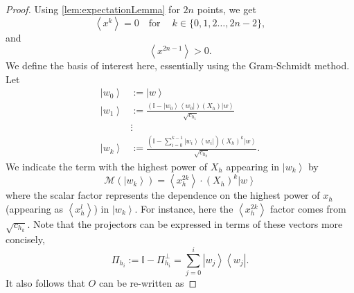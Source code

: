 \documentclass{theoretics}
\begin{document}
\begin{proof}
  Using \cref{lem:expectationLemma} for $2n$ points, we get
  \begin{equation}
    \left\langle x^{k}\right\rangle =0\ \ \  \text{ for }\ \ \ \  k\in\{0,1,2\dots,2n-2\},\label{eq:Mochonsf0equality}
  \end{equation}
  and
  \begin{equation}
    \left\langle x^{2n-1}\right\rangle >0.\label{eq:Mochonsf0Positivity}
  \end{equation}
  We define the basis of interest here, essentially using the Gram-Schmidt
  method. Let
  \begin{align}
    \left|w_{0}\right\rangle & :=\left|w\right\rangle \nonumber                                                                                                                                     \\
    \left|w_{1}\right\rangle & :=\frac{\left(\mathbb{I}-\left|w_{0}\right\rangle \left\langle w_{0}\right|\right)(X_{h})\left|w\right\rangle }{\sqrt{c_{h_{1}}}}\nonumber                           \\
                             & \vdots\nonumber                                                                                                                                                      \\
    \left|w_{k}\right\rangle & :=\frac{\left(\mathbb{I}-\sum_{i=0}^{k-1}\left|w_{i}\right\rangle \left\langle w_{i}\right|\right)(X_{h})^{k}\left|w\right\rangle }{\sqrt{c_{h_{k}}}}.\label{eq:w_k}
  \end{align}
  We indicate the term with the highest power of $X_{h}$ appearing
  in $\left|w_{k}\right\rangle $ by
  \begin{displaymath}
    \mathcal{M}(\left|w_{k}\right\rangle )=\left\langle x_{h}^{2k}\right\rangle \cdot(X_{h})^{k}\left|w\right\rangle
  \end{displaymath}
  where the scalar factor represents the dependence on the
  highest power of $x_{h}$ (appearing as $\left\langle x_{h}^{l}\right\rangle $)
  in $\left|w_{k}\right\rangle $. For instance, here the $\left\langle x_{h}^{2k}\right\rangle $
  factor comes from $\sqrt{c_{h_{k}}}$. Note that the projectors can
  be expressed in terms of these vectors more concisely,
  \begin{displaymath}
    \Pi_{h_{i}}:=\mathbb{I}-\Pi_{h_{i}}^{\perp}=\sum_{j=0}^{i}\left|w_{j}\right\rangle \left\langle w_{j}\right|.
  \end{displaymath}
  It also follows that $O$ can be re-written as

\end{proof}
\end{document}
